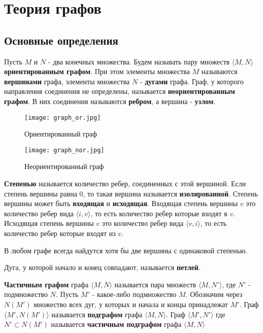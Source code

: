 \chapter{Теория графов}
\section{Основные определения}
Пусть $M$ и $N$ - два конечных множества. Будем называть пару множеств $\langle M, N \rangle$ \textbf{ориентированным графом}.
При этом элементы множества $M$ называются \textbf{вершинами} графа, элементы множества $N$ - \textbf{дугами} графа. 
Граф, у которого направления соединения не определены, называется \textbf{неориентированным графом}. В них
соединения называются \textbf{ребром}, а вершина - \textbf{узлом}.

\begin{figure*}[!h]
    \centering
    \begin{minipage}[t]{4cm}
        \centering
        \texttt{[image: graph\_or.jpg]}
        \caption{Ориентированный граф}
    \end{minipage}
    \hspace{3cm}
    \begin{minipage}[t]{4cm}
        \centering
        \texttt{[image: graph\_nor.jpg]}
        \caption{Неориентированный граф}
    \end{minipage}
\end{figure*}

\textbf{Степенью} называется количество ребер, соединенных с этой вершиной.
Если степень вершины равна 0, то такая вершина называется \textbf{изолированной}.
Степень вершины может быть \textbf{входящая} и \textbf{исходящая}. Входящая степень вершины $v$
это количество ребер вида $\langle i, v \rangle$, то есть количество ребер которые входят в $v$.
Исходящая степень вершины $v$ это количество ребер вида $\langle v, i \rangle$, то есть количество ребер
которые входят из $v$.

\begin{thm}
    В любом графе всегда найдутся хотя бы две вершины с одинаковой степенью.
\end{thm}

Дуга, у которой начало и конец совпадают, называется \textbf{петлей}.

\textbf{Частичным графом} графа  $\langle M, N \rangle$ называется пара множеств $\langle M, N'\rangle$, где $N'$ - 
подмножество $N$. Пусть $M'$ - какое-либо подмножество $M$. Обозначим через $N(M')$ множество всех
дуг, у которых и начала и концы принадлежат $M'$. Граф $\langle M', N(M')\rangle$ называется \textbf{подграфом} графа $\langle M, N\rangle$.
Граф $\langle M', N'\rangle$ где $N' \subset N(M')$ называется  \textbf{частичным подграфом} графа $\langle M, N\rangle$

